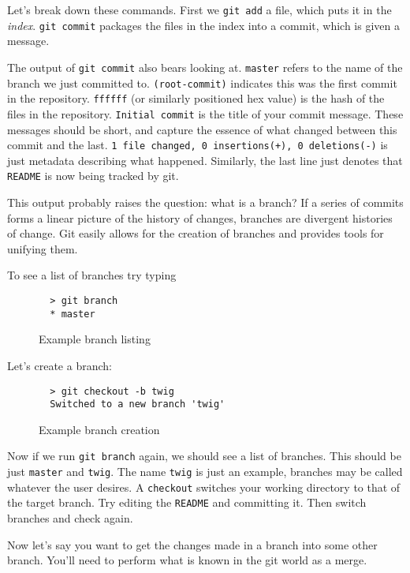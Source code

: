 \documentclass[11pt]{report}
\begin{document}
Let's break down these commands. First we \texttt{git add} a file,
which puts it in the \emph{index}. \texttt{git commit} packages the
files in the index into a commit, which is given a message.

The output of \texttt{git commit} also bears looking
at. \texttt{master} refers to the name of the branch we just committed
to. \texttt{(root-commit)} indicates this was the first commit in the
repository. \texttt{ffffff} (or similarly positioned hex value) is the
hash of the files in the repository. \texttt{Initial commit} is the
title of your commit message. These messages should be short, and
capture the essence of what changed between this commit and the
last. \texttt{1 file changed, 0 insertions(+), 0 deletions(-)} is just
metadata describing what happened. Similarly, the last line just
denotes that \texttt{README} is now being tracked by git.

This output probably raises the question: what is a branch?  If a
series of commits forms a linear picture of the history of changes,
branches are divergent histories of change. Git easily allows for the
creation of branches and provides tools for unifying them.

To see a list of branches try typing 
\begin{figure}[H]
  \caption{Example branch listing}
  \begin{lstlisting}
  > git branch
  * master
  \end{lstlisting}
 \end{figure}

Let's create a branch:
\begin{figure}[H]
  \caption{Example branch creation}
  \begin{lstlisting}
  > git checkout -b twig
  Switched to a new branch 'twig'
  \end{lstlisting}
\end{figure}

Now if we run \texttt{git branch} again, we should see a list of
branches. This should be just \texttt{master} and \texttt{twig}.
The name \texttt{twig} is just an example, branches may be called
whatever the user desires. A \texttt{checkout} switches your working
directory to that of the target branch. Try editing the \texttt{README}
and committing it. Then switch branches and check again.

Now let's say you want to get the changes made in a branch into some other
branch. You'll need to perform what is known in the git world as a
merge.
\end{document}
